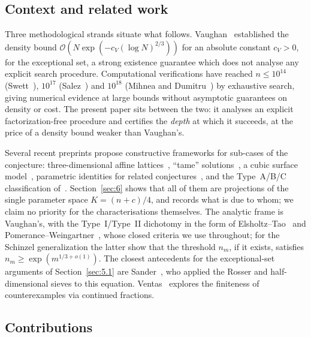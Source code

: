 \documentclass[11pt, a4paper]{article}
\theoremstyle{plain}
\theoremstyle{definition}
\begin{document}
\subsection{Context and related work} \label{sec:recent_approaches}
Three methodological strands situate what follows. Vaughan~\cite{vaughan1970} established the density bound $\mathcal{O}(N\exp(-c_V(\log N)^{2/3}))$ for an absolute constant $c_V>0$, for the exceptional set, a strong existence guarantee which does not analyse any explicit search procedure. Computational verifications have reached $n\le10^{14}$ (Swett~\cite{swett1999}), $10^{17}$ (Salez~\cite{salez2014}) and $10^{18}$ (Mihnea and Dumitru~\cite{mihnea2025}) by exhaustive search, giving numerical evidence at large bounds without asymptotic guarantees on density or cost. The present paper sits between the two: it analyses an explicit factorization-free procedure and certifies the \emph{depth} at which it succeeds, at the price of a density bound weaker than Vaughan's.

Several recent preprints propose constructive frameworks for sub-cases of the conjecture: three-dimensional affine lattices~\cite{dyachenko2025}, ``tame'' solutions~\cite{xu2026}, a cubic surface model~\cite{bello2026}, parametric identities for related conjectures~\cite{ghermoul2025, mballa2026a, mballa2026b}, and the Type~A/B/C classification of~\cite{lopez2022, lopez2024}. Section~\ref{sec:6} shows that all of them are projections of the single parameter space $K=(n+c)/4$, and records what is due to whom; we claim no priority for the characterisations themselves. The analytic frame is Vaughan's, with the Type~I/Type~II dichotomy in the form of Elsholtz--Tao~\cite{elsholtz2013} and Pomerance--Weingartner~\cite{pomerance2026}, whose closed criteria we use throughout; for the Schinzel generalization the latter show that the threshold $n_m$, if it exists, satisfies $n_m\ge\exp(m^{1/3+o(1)})$. The closest antecedents for the exceptional-set arguments of Section~\ref{sec:5.1} are Sander~\cite{sander1991,sander1994}, who applied the Rosser and half-dimensional sieves to this equation. Ventas~\cite{ventas2026} explores the finiteness of counterexamples via continued fractions.

\subsection{Contributions} \label{sec:contributions}
\end{document}
